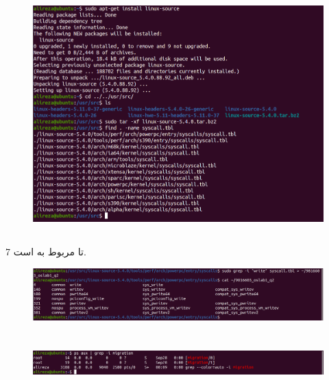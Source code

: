 \documentclass{article}
\begin{document}
\section{}
\subsection{}
\begin{figure}[ht]
    \centering
    \includegraphics[width=1.0\textwidth]{figures/a.png}
    \caption{}
    \label{fig:fig1}
\end{figure}
\FloatBarrier

\subsection{}
7 تا مربوط به
است.
\begin{figure}[ht]
    \centering
    \includegraphics[width=1.0\textwidth]{figures/b.png}
    \caption{}
    \label{fig:fig1}
\end{figure}
\FloatBarrier

\section{}
\begin{figure}[ht]
    \centering
    \includegraphics[width=1.0\textwidth]{figures/5.png}
    \caption{}
    \label{fig:fig1}
\end{figure}
\FloatBarrier
\end{document}
